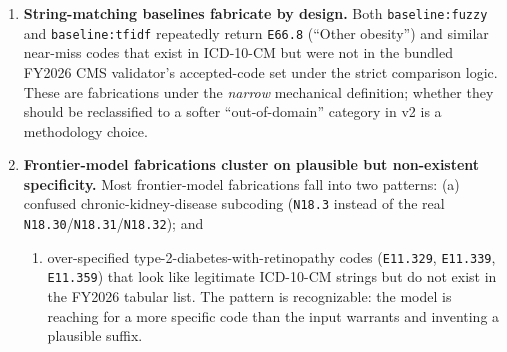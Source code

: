 \begin{enumerate}
\def\labelenumi{\arabic{enumi}.}
\tightlist
\item
  \textbf{String-matching baselines fabricate by design.} Both
  \texttt{baseline:fuzzy} and \texttt{baseline:tfidf} repeatedly return \texttt{E66.8}
  (``Other obesity'') and similar near-miss codes that exist in
  ICD-10-CM but were not in the bundled FY2026 CMS validator's
  accepted-code set under the strict comparison logic. These are
  fabrications under the \emph{narrow} mechanical definition; whether
  they should be reclassified to a softer ``out-of-domain''
  category in v2 is a methodology choice.
\item
  \textbf{Frontier-model fabrications cluster on plausible but
  non-existent specificity.} Most frontier-model fabrications fall
  into two patterns: (a) confused chronic-kidney-disease subcoding
  (\texttt{N18.3} instead of the real \texttt{N18.30}/\texttt{N18.31}/\texttt{N18.32}); and

  \begin{enumerate}
  \def\labelenumii{(\alph{enumii})}
  \setcounter{enumii}{1}
  \tightlist
  \item
    over-specified type-2-diabetes-with-retinopathy codes
    (\texttt{E11.329}, \texttt{E11.339}, \texttt{E11.359}) that look like legitimate
    ICD-10-CM strings but do not exist in the FY2026 tabular list.
    The pattern is recognizable: the model is reaching for a more
    specific code than the input warrants and inventing a plausible
    suffix.
  \end{enumerate}
\end{enumerate}
